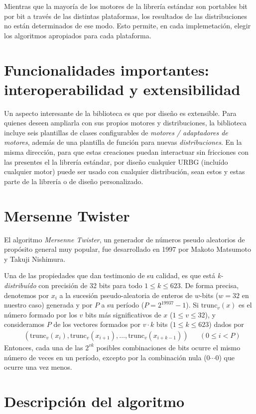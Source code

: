 \documentclass{article}
\begin{document}
Mientras que la mayoría de los motores de la librería estándar son portables bit por bit a través de las distintas plataformas, los resultados de las distribuciones no están determinados de ese modo.
Esto permite, en cada implemetación, elegir los algoritmos apropiados para cada plataforma.

\section{Funcionalidades importantes: interoperabilidad y extensibilidad}
Un aspecto interesante de la biblioteca es que por diseño es extensible.
Para quienes deseen ampliarla con sus propios motores y distribuciones, la biblioteca incluye seis plantillas de clases configurables de \emph{motores / adaptadores de motores}, además de una plantilla de función para nuevas \emph{distribuciones}.
En la misma dirección, para que estas creaciones puedan interactuar sin fricciones con las presentes el la librería estándar, por diseño cualquier URBG (incluído cualquier motor) puede ser usado con cualquier distribución, sean estos y estas parte de la librería o de diseño personalizado.

\section{Mersenne Twister}
El algoritmo \emph{Mersenne Twister}, un generador de números pseudo aleatorios de propósito general muy popular, fue desarrollado en 1997 por Makoto Matsumoto y Takuji Nishimura.

Una de las propiedades que dan testimonio de su calidad, es que está \emph{k-distribuído} con precisión de 32 bits para todo $1 \leq k \leq 623$.
De forma precisa, denotemos por $x_i$ a la sucesión pseudo-aleatoria de enteros de $w$-bits ($w = 32$ en nuestro caso) generada y por $P$ a su período ($P = 2^{19937} - 1$).
Si $\text{trunc}_v(x)$ es el número formado por los $v$ bits más significativos de $x$ ($1 \leq v \leq 32$), y consideramos $P$ de los vectores formados por $v \cdot k$ bits ($1 \leq k \leq 623$) dados por
\begin{align}
	&(\text{trunc}_v(x_i), \text{trunc}_v(x_{i + 1}), \dots, \text{trunc}_v(x_{i + k - 1}))
	&& (0 \leq i < P)
\end{align}
Entonces, cada una de las $2^{v k}$ posibles combinaciones de bits ocurre el mismo número de veces en un período, excepto por la combinación nula ($0 \cdots 0$) que ocurre una vez menos.

\section{Descripción del algoritmo}
\end{document}
